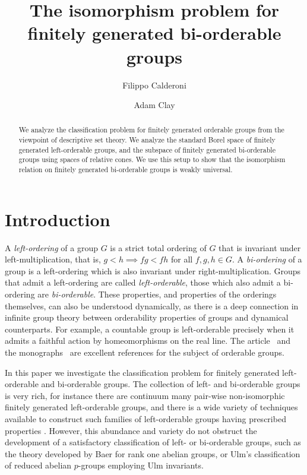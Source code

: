 \documentclass{amsart}
\title{The isomorphism problem for finitely generated bi-orderable groups}
\author[F.~Calderoni]{Filippo Calderoni}
\author[A.~Clay]{Adam Clay}
\theoremstyle{definition}
\theoremstyle{remark}
\begin{document}
\begin{abstract}
We analyze the classification problem for finitely generated orderable groups from the viewpoint of descriptive set theory. We analyze the standard Borel space of finitely generated left-orderable groups, and the subspace of finitely generated bi-orderable groups using spaces of relative cones.  We use this setup to show that the isomorphism relation on  finitely generated bi-orderable groups is weakly universal.
\end{abstract}

\maketitle

\section{Introduction}

A \emph{left-ordering} of a group $G$ is a strict total ordering of $G$ that is invariant under left-multiplication, that is,
\(
g<h \implies  fg<fh
\)
for all \(f,g,h\in G\).  A \emph{bi-ordering} of a group is a left-ordering which is also invariant under right-multiplication.  Groups that admit a left-ordering are called \emph{left-orderable}, those which also admit a bi-ordering are \emph{bi-orderable}.  These properties, and properties of the orderings themselves, can also be understood dynamically, as there is a deep connection in infinite group theory between orderability properties of groups and dynamical counterparts.  For example, a countable group is left-orderable precisely when it admits a faithful action by homeomorphisms on the real line. The article~\cite{Nav10} and the monographs~\cite{ClaRol,DerNavRiv} are excellent references for the subject of orderable groups.

In this paper we investigate the classification problem for finitely generated left-orderable and bi-orderable groups.  The collection of left- and bi-orderable groups is very rich, for instance there are continuum many  pair-wise non-isomorphic finitely generated left-orderable groups, and there is a wide variety of techniques available to construct such families of left-orderable groups having prescribed properties \cite{KimKobLod, HydLod, BoyGorHu}. However, this abundance and variety do not obstruct the development of a satisfactory classification of left- or bi-orderable groups, such as the theory developed by Baer for rank one abelian groups, or Ulm's classification of reduced abelian \(p\)-groups employing Ulm invariants.
\end{document}

